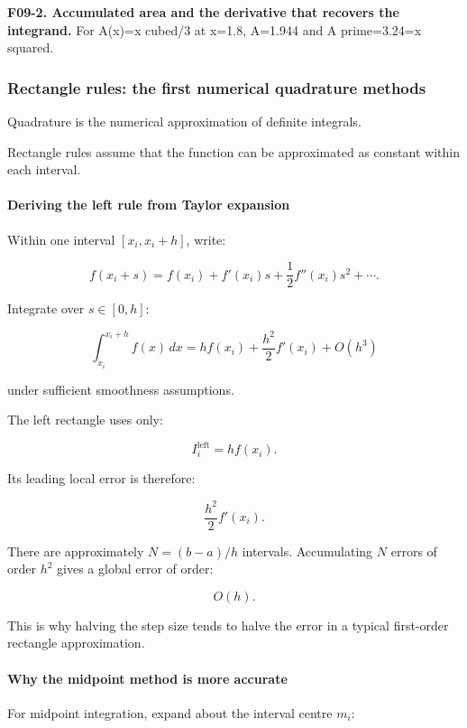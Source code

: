 \textbf{F09-2. Accumulated area and the derivative that recovers the integrand.} For A(x)=x cubed/3 at x=1.8, A=1.944 and A prime=3.24=x squared.

\subsubsection{Rectangle rules: the first numerical quadrature methods}\label{02-foundations-ii-ch022-rectangle-rules-the-first-numerical-quadrature-methods}

Quadrature is the numerical approximation of definite integrals.

Rectangle rules assume that the function can be approximated as constant within each interval.

\paragraph{Deriving the left rule from Taylor expansion}\label{02-foundations-ii-ch022-deriving-the-left-rule-from-taylor-expansion}

Within one interval \([x_i,x_i+h]\), write:

\[
f(x_i+s)=f(x_i)+f'(x_i)s+\frac12f''(x_i)s^2+\cdots.
\]

Integrate over \(s\in[0,h]\):

\[
\int_{x_i}^{x_i+h}f(x)\,dx = hf(x_i)+\frac{h^2}{2}f'(x_i)+O(h^3)
\]

under sufficient smoothness assumptions.

The left rectangle uses only:

\[
I_i^{\mathrm{left}}=hf(x_i).
\]

Its leading local error is therefore:

\[
\frac{h^2}{2}f'(x_i).
\]

There are approximately \(N=(b-a)/h\) intervals. Accumulating \(N\) errors of order \(h^2\) gives a global error of order:

\[
\boxed{O(h)}.
\]

This is why halving the step size tends to halve the error in a typical first-order rectangle approximation.

\paragraph{Why the midpoint method is more accurate}\label{02-foundations-ii-ch022-why-the-midpoint-method-is-more-accurate}

For midpoint integration, expand about the interval centre \(m_i\):

